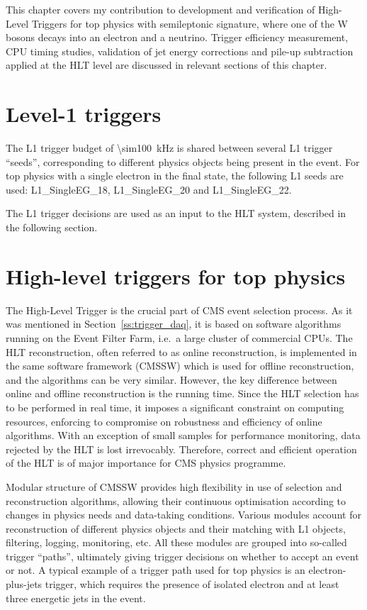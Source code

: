 This chapter covers my contribution to development and verification of High-Level Triggers for top physics with
semileptonic signature, where one of the W bosons decays into an electron and a neutrino. Trigger efficiency
measurement, CPU timing studies, validation of jet energy corrections and pile-up subtraction applied at the HLT level
are discussed in relevant sections of this chapter.

\section{Level-1 triggers}
The L1 trigger budget of \SI{\sim100}{\kilo\hertz} is shared between several L1 trigger ``seeds'', corresponding to
different physics objects being present in the event. For top physics with a single electron in the final state, the
following L1 seeds are used: L1\_SingleEG\_18, L1\_SingleEG\_20 and L1\_SingleEG\_22.


The L1 trigger decisions are used as an input to the HLT system, described in the following section.

\clearpage

\section{High-level triggers for top physics}
\label{s:hlt_for_top_physics}
The High-Level Trigger \cite{HLT} is the crucial part of CMS event selection process. As it was mentioned in
Section~\ref{ss:trigger_daq}, it is based on software algorithms running on the Event Filter Farm, i.e.\ a large cluster
of commercial CPUs. The HLT reconstruction, often referred to as online reconstruction, is implemented in the same
software framework (CMSSW) which is used for offline reconstruction, and the algorithms can be very similar. However,
the key difference between online and offline reconstruction is the running time. Since the HLT selection has to be
performed in real time, it imposes a significant constraint on computing resources, enforcing to compromise on
robustness and efficiency of online algorithms. With an exception of small samples for performance monitoring, data
rejected by the HLT is lost irrevocably. Therefore, correct and efficient operation of the HLT is of major importance
for CMS physics programme.

Modular structure of CMSSW provides high flexibility in use of selection and reconstruction algorithms, allowing their
continuous optimisation according to changes in physics needs and data-taking conditions. Various modules account for
reconstruction of different physics objects and their matching with L1 objects, filtering, logging, monitoring, etc. All
these modules are grouped into so-called trigger ``paths'', ultimately giving trigger decisions on whether to accept an
event or not. A typical example of a trigger path used for top physics is an electron-plus-jets trigger, which requires
the presence of isolated electron and at least three energetic jets in the event.

